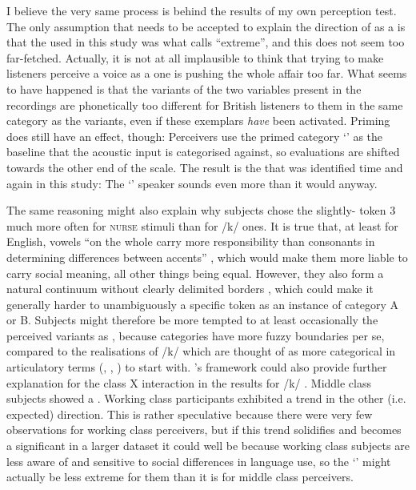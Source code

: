 I believe the very same process is behind the results of my own perception test.
The only assumption that needs to be accepted to explain the direction of  as a  is that the  used in this study was what \citeauthor{herr1986} calls ``extreme'', and this does not seem too far-fetched.
Actually, it is not at all implausible to think that trying to make listeners perceive a  voice as a  one is pushing the whole affair too far.
What seems to have happened is that the  variants of the two  variables present in the recordings are phonetically too different for British listeners to  them in the same category as the  variants, even if these exemplars \emph{have} been activated.
Priming does still have an effect, though: Perceivers use the primed category `' as the baseline that the acoustic input is categorised against, so evaluations are shifted towards the other end of the scale.
The result is the  that was identified time and again in this study: The `' speaker sounds even more  than it would anyway.

The same reasoning might also explain why subjects chose the slightly- token 3 much more often for \textsc{nurse} stimuli than for /k/ ones.
It is true that, at least for English, vowels ``on the whole carry more responsibility than consonants in determining differences between accents'' \parencite[12]{foulkesdocherty1999a}, which would make them more liable to carry social meaning, all other things being equal.
However, they also form a natural continuum without clearly delimited borders \parencite[cf.][12]{foulkesdocherty1999a}, which could make it generally harder to unambiguously  a specific token as an instance of category A or B.
Subjects might therefore be more tempted to at least occasionally  the perceived variants as , because  categories have more fuzzy boundaries per se, compared to the realisations of /k/ which are thought of as more categorical in articulatory terms (, , ) to start with.
\citeauthor{herr1986}'s framework could also provide further explanation for the class X  interaction in the results for /k/ .
Middle class subjects showed a .
Working class participants exhibited a trend in the other (i.e. expected) direction.
This is rather speculative because there were very few observations for working class perceivers, but if this trend solidifies and becomes a significant  in a larger dataset it could well be because working class subjects are less aware of and sensitive to social differences in language use, so the  `' might actually be less extreme for them than it is for middle class perceivers.


